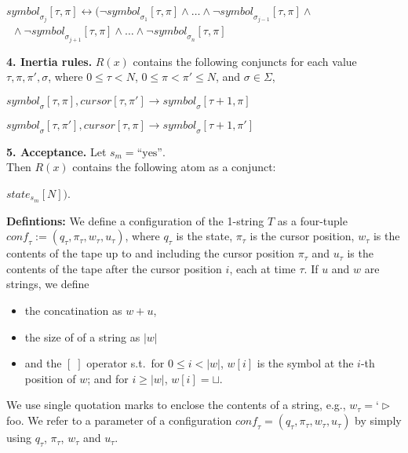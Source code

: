 \documentclass [11pt]{article}
\newcommand{\ra}{\rightarrow}
\newcommand{\blank}{\sqcup}
\newcommand{\ssym}{\triangleright}
\newcommand{\yess}{\mbox{``yes''}}
\newcommand{\sym}[3]{\textit{symbol}_{#1}[#2,#3]}
\newcommand{\cursor}[2]{\textit{cursor}[#1,#2]}
\newcommand{\state}[2]{\textit{state}_{#1}[#2]}
\newcommand{\conf}{\textit{conf}}
\newcommand{\conft}{\ensuremath{\conf_{\tau}}}
\newcommand{\pt}{\ensuremath{\pi_{\tau}}}
\newcommand{\qt}{\ensuremath{q_{\tau}}}
\newcommand{\wt}{\ensuremath{w_{\tau}}}
\newcommand{\ut}{\ensuremath{u_{\tau}}}
\newcommand{\lqm}{\text{`}}
\newcommand{\rqm}{\text{'}}
\begin{document}
\noindent
$\sym{\sigma_j}{\tau}{\pi} \leftrightarrow
(\neg \sym{\sigma_1}{\tau}{\pi} \wedge \dots \wedge
\neg \sym{\sigma_{j-1}}{\tau}{\pi} \wedge \mbox{}$ \\
\mbox{} \quad \ $\mbox{}\wedge 
\neg \sym{\sigma_{j+1}}{\tau}{\pi} \wedge \dots \wedge
\neg \sym{\sigma_{n}}{\tau}{\pi}$


\smallskip 
\noindent
{\bf 4. Inertia rules.} 
$R(x)$ contains the
following conjuncts for each value $\tau, \pi, \pi', \sigma$,
where $0 \leq \tau < N$, $0 \leq \pi < \pi' \leq N$, and
$\sigma \in \Sigma$, 


\smallskip 

\noindent
$\sym{\sigma}{\tau}{\pi}, \cursor{\tau}{\pi'} \ra 
\sym{\sigma}{\tau+1}{\pi}$

\noindent
$\sym{\sigma}{\tau}{\pi'}, \cursor{\tau}{\pi} \ra 
\sym{\sigma}{\tau+1}{\pi'}$


\smallskip 
\noindent
{\bf 5. Acceptance.} 
Let $s_m = \yess$. \\
Then  $R(x)$ contains the following atom as a conjunct:

\smallskip

\noindent
$\state{s_m}{N})$.



\bigskip

\noindent
\textbf{Defintions:}
We define a configuration of the 1-string $T$ as a four-tuple $\conf_{\tau} := (\qt , \pt , \wt, \ut)$, where $\qt$ is the state, $\pt$ is the cursor position, $\wt$ is the contents of the tape up to and including the cursor position $\pt$ and $\ut$ is the contents of the tape after the cursor position $i$, each at time $\tau$. 
If $u$ and $w$ are strings, we define
\begin{itemize}
 \item the concatination as $w+u$,
 \item the size of of a string as $|w|$
 \item and the $[\;]$ operator s.t.~for $0\leq i < |w|$, $w[i]$ is the symbol at the $i$-th position of $w$; and for $i \geq |w|$, $w[i] = \blank$.
\end{itemize}
We use single quotation marks to enclose the contents of a string, e.g., $\wt=\lqm \ssym$foo\rqm.
We refer to a parameter of a configuration $\conft = (\qt, \pt, \wt, \ut)$ by simply using $\qt$, $\pt$, $\wt$ and $\ut$.

\medskip
\end{document}
